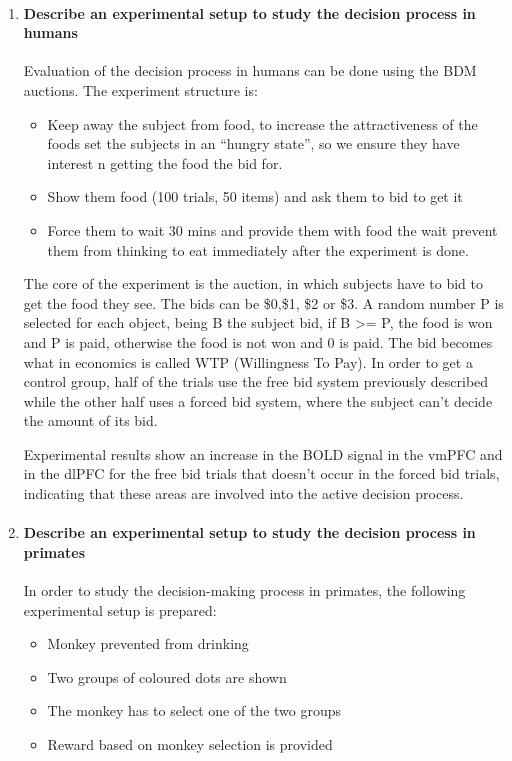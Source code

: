 \documentclass[12pt,article,oneside,a4paper]{memoir}
\begin{document}
\begin{enumerate}
\item \paragraph{Describe an experimental setup to study the decision process
in humans}

Evaluation of the decision process in humans can be done using the BDM
auctions. The experiment structure is:

\begin{itemize}
\item Keep away the subject from food, to increase the attractiveness of the
foods
\subitem set the subjects in an “hungry state”, so we ensure they have interest
n getting the food the bid for.
\item Show them food (100 trials, 50 items) and ask them to bid to get it
\item Force them to wait 30 mins and provide them with food
\subitem the wait prevent them from thinking to eat immediately after the
experiment is done.
\end{itemize}

The core of the experiment is the auction, in which subjects have to bid to get
the food they see. The bids can be \$0,\$1, \$2 or \$3. A random number P is
selected for each object, being B the subject bid, if B >= P, the food is won
and P is paid, otherwise the food is not won and 0 is paid.
The bid becomes what in economics is called WTP (Willingness To Pay). In order
to get a control group, half of the trials use the free bid system previously
described while the other half uses a forced bid system, where the subject
can’t decide the amount of its bid.

Experimental results show an increase in the BOLD signal in the vmPFC and in
the dlPFC for the free bid trials that doesn’t occur in the forced bid trials,
indicating that these areas are involved into the active decision process.

\item \paragraph{Describe an experimental setup to study the decision process
in primates}

In order to study the decision-making process in primates, the following
experimental setup is prepared:

\begin{itemize}
\item Monkey prevented from drinking
\item Two groups of coloured dots are shown
\item The monkey has to select one of the two groups
\item Reward based on monkey selection is provided
\end{itemize}


\end{enumerate}
\end{document}
